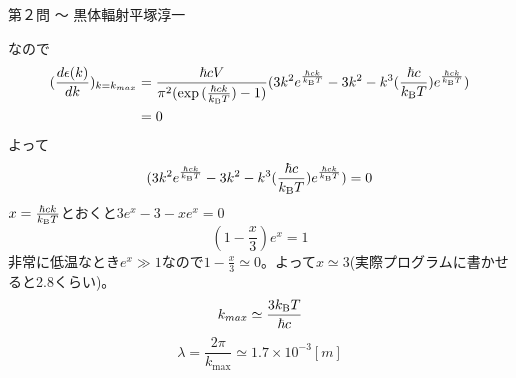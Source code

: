 \begin{answer}{第２問 〜 黒体輻射}{平塚淳一}
\begin{enumerate}
\begin{equation}
  \end{equation}
  なので
  \begin{align}
  (\frac{d\epsilon(k)}{dk})_{k=k_{max}}
  &=\frac{\hbar cV}{\pi^2(\exp{(\frac{\hbar ck}{k_\mathrm{B}T})}-1)}(3k^2e^{\frac{\hbar ck}{k_\mathrm{B} T}}-3k^2-k^3(\frac{\hbar c}{k_\mathrm{B} T})e^{\frac{\hbar ck}{k_\mathrm{B} T}})\\
  &=0
  \end{align}
  よって
  \begin{equation}
  (3k^2e^{\frac{\hbar ck}{k_\mathrm{B} T}}-3k^2-k^3(\frac{\hbar c}{k_\mathrm{B} T})e^{\frac{\hbar ck}{k_\mathrm{B} T}})
  =0
  \end{equation}
  $x=\frac{\hbar ck}{k_\mathrm{B} T}$とおくと$3e^x-3-xe^x=0$
  \begin{equation}
  (1-\frac{x}{3})e^x=1
  \end{equation}
  非常に低温なとき$e^x\gg1$なので$1-\frac{x}{3}\simeq 0$。よって$x\simeq 3$(実際プログラムに書かせると2.8くらい)。
  \begin{equation}
  k_{max} \simeq\frac{3k_\mathrm{B} T}{\hbar c}
  \end{equation}
  \begin{equation}
  \lambda =\frac{2\pi}{k_\mathrm{max}}\simeq 1.7\times 10^{-3}[m]
  \end{equation}
\end{enumerate}
\end{answer}
